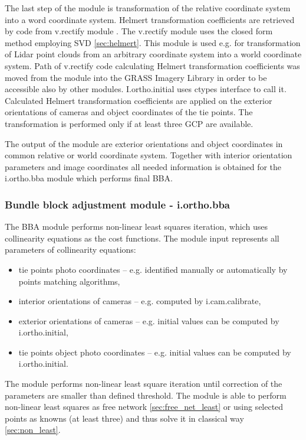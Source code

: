 \documentclass[a4paper,12pt]{article}
\begin{document}
The last step of the module is transformation of the relative coordinate system into a word coordinate system.
Helmert 
transformation coefficients are retrieved by code from v.rectify module \cite{v.rectify}.
The v.rectify module uses the closed form method employing SVD \ref{sec:helmert}.
This module is used e.g. for transformation of Lidar point clouds from an arbitrary coordinate system into 
a world coordinate system. 
Path of v.rectify code calculating Helmert transformation coefficients
was moved from the module into the GRASS Imagery Library in order to be accessible also by other modules.
I.ortho.initial uses ctypes interface to call it.
Calculated Helmert transformation coefficients are applied on the exterior orientations of cameras and object coordinates of the tie points.
The transformation is performed only if at least three GCP are available.

The output of the module are exterior orientations and object coordinates in common relative or world coordinate system. Together with interior
orientation parameters and image coordinates all needed information is obtained for the i.ortho.bba module which performs final BBA.  

\subsubsection{Bundle block adjustment module - i.ortho.bba}

The BBA module performs non-linear least squares iteration, which 
uses collinearity equations as the cost functions. 
The module input represents all parameters of collinearity equations:
\begin{itemize}
\item tie points photo coordinates -- e.g. identified manually or automatically by points matching algorithms,
\item interior orientations of cameras -- e.g. computed by i.cam.calibrate,
\item exterior orientations of cameras -- e.g. initial values can be computed by i.ortho.initial,
\item tie points object photo coordinates -- e.g. initial values can be computed by i.ortho.initial.
\end{itemize}

The module performs non-linear least square iteration until correction of the parameters are smaller than
defined threshold. The module is able to perform non-linear least squares as free network \ref{sec:free_net_least} or using selected points 
as knowns (at least three) and thus solve it in classical way \ref{sec:non_least}. 
\end{document}
